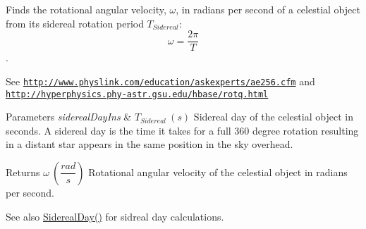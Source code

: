Finds the rotational angular velocity, $\omega$, in radians per second of a celestial object from its sidereal rotation period $T_{Sidereal}$\+: \[ \omega = \dfrac{2\pi}{T} \]. 

See \href{http://www.physlink.com/education/askexperts/ae256.cfm}{\tt http\+://www.\+physlink.\+com/education/askexperts/ae256.\+cfm} and \href{http://hyperphysics.phy-astr.gsu.edu/hbase/rotq.html}{\tt http\+://hyperphysics.\+phy-\/astr.\+gsu.\+edu/hbase/rotq.\+html} 
\begin{DoxyParams}{Parameters}
{\em sidereal\+Day\+Ins} & $ T_{Sidereal}\ (s)$ Sidereal day of the celestial object in seconds. A sidereal day is the time it takes for a full 360 degree rotation resulting in a distant star appears in the same position in the sky overhead. \\
\hline
\end{DoxyParams}
\begin{DoxyReturn}{Returns}
$ \omega\ (\dfrac{rad}{s})$ Rotational angular velocity of the celestial object in radians per second. 
\end{DoxyReturn}
\begin{DoxySeeAlso}{See also}
\mbox{\hyperlink{group___e_g_x_phys-_astrophysic-_sidereal_day_ga587900d5fc755228c1bb5121cd7965c6}{Sidereal\+Day()}} for sidreal day calculations. 
\end{DoxySeeAlso}
